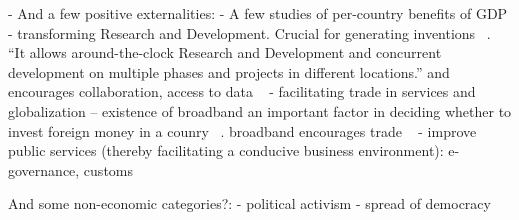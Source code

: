 - And a few positive externalities:
   - A few studies of per-country benefits of GDP 
   - transforming Research and Development. Crucial for generating inventions ~\cite{carlaw2007past}. 
``It allows around-the-clock Research and Development and concurrent
development on multiple phases and projects in different locations.'' and encourages collaboration, access to data ~\cite{van2008broadband}
   - facilitating trade in services and globalization -- existence of broadband an important factor in deciding whether to invest foreign money in a counry ~\cite{abramovsky2006outsourcing}. broadband encourages trade ~\cite{attendusing}
   - improve public services (thereby facilitating a conducive business environment): e-governance, customs ~\cite{de2004customs}

And some non-economic categories?:
   - political activism
   - spread of democracy


